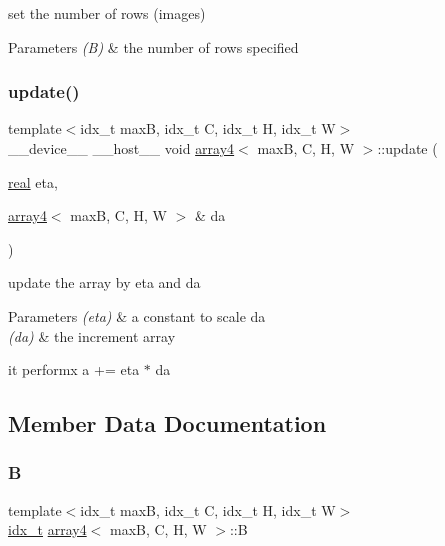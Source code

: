 set the number of rows (images) 


\begin{DoxyParams}{Parameters}
{\em (\+B)} & the number of rows specified \\
\hline
\end{DoxyParams}
\mbox{\label{structarray4_aec956ca804fd9176479805bd753b4b1a}} 
\subsubsection{\texorpdfstring{update()}{update()}}
{\footnotesize\ttfamily template$<$idx\+\_\+t maxB, idx\+\_\+t C, idx\+\_\+t H, idx\+\_\+t W$>$ \\
\+\_\+\+\_\+device\+\_\+\+\_\+ \+\_\+\+\_\+host\+\_\+\+\_\+ void \hyperlink{structarray4}{array4}$<$ maxB, C, H, W $>$\+::update (\begin{DoxyParamCaption}\item[{\hyperlink{vgg__util_8h_a1082d08aaa761215ec83e7149f27ad16}{real}}]{eta,  }\item[{\hyperlink{structarray4}{array4}$<$ maxB, C, H, W $>$ \&}]{da }\end{DoxyParamCaption})\hspace{0.3cm}{\ttfamily [inline]}}



update the array by eta and da 


\begin{DoxyParams}{Parameters}
{\em (eta)} & a constant to scale da \\
\hline
{\em (da)} & the increment array\\
\hline
\end{DoxyParams}
it performx a += eta $\ast$ da 

\subsection{Member Data Documentation}
\mbox{\label{structarray4_a68aee457ea4034e17475b6ec5c497c12}} 
\subsubsection{\texorpdfstring{B}{B}}
{\footnotesize\ttfamily template$<$idx\+\_\+t maxB, idx\+\_\+t C, idx\+\_\+t H, idx\+\_\+t W$>$ \\
\hyperlink{vgg__util_8h_a8e93478a00e685bea5e6a3f617bf03a3}{idx\+\_\+t} \hyperlink{structarray4}{array4}$<$ maxB, C, H, W $>$\+::B}

